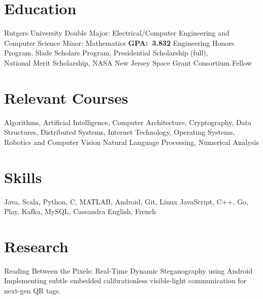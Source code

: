 \documentclass[11pt,letterpaper]{moderncv}
\begin{document}
\section{Education}

    {Rutgers University}
    {Double Major: Electrical/Computer Engineering and Computer Science}
    {Minor: Mathematics}
    {\textbf{GPA:~3.832}}
    {Engineering Honors Program, Slade Scholars Program, Presidential Scholarship (full),\\National Merit Scholarship, NASA New Jersey Space Grant Consortium Fellow}


\section{Relevant Courses}
       {Algorithms, Artificial Intelligence, Computer Architecture, Cryptography, Data Structures, Distributed Systems, Internet Technology, Operating Systems, Robotics and Computer Vision
       }
       {Natural Language Processing, Numerical Analysis}

\section{Skills}
       {Java, Scala, Python, C, MATLAB, Android, Git, Linux}
       {JavaScript, C++, Go, Play, Kafka, MySQL, Cassandra}
       {English, French}

\section{Research}
		{Reading Between the Pixels: Real-Time Dynamic Steganography using Android}
        {}
        {}
        {}
        {Implementing subtle embedded calibrationless visible-light communication for next-gen QR tags.}

%
\end{document}
